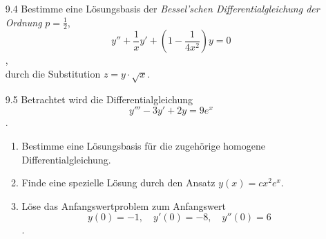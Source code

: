 \documentclass{../HM}
\begin{document}
\begin{enumerate}
		\item [9.4] Bestimme eine Lösungsbasis der \textit{Bessel'schen Differentialgleichung der Ordnung} $p=\frac{1}{2}$,
		$$y''+\frac{1}{x}y'+(1-\frac{1}{4x^2})y=0$$,\\
		durch die Substitution $z=y\cdot\sqrt{x}$.
		
		\item [9.5] Betrachtet wird die Differentialgleichung
		$$y'''-3y'+2y=9e^x$$.\\
		\begin{enumerate}
			\item Bestimme eine Lösungsbasis für die zugehörige homogene Differentialgleichung.
			
			\item Finde eine spezielle Lösung durch den Ansatz $y(x)=cx^2e^x$.
			
			\item Löse das Anfangswertproblem zum Anfangswert
			$$y(0)=-1,\quad y'(0)=-8,\quad y''(0)=6$$.
		\end{enumerate}
	\end{enumerate}
\end{document}
